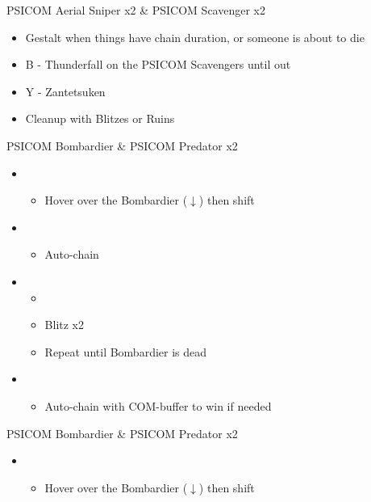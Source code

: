 \begin{paracol}{2}
\begin{battle}{PSICOM Aerial Sniper x2 \& PSICOM Scavenger x2}
\begin{itemize}
\begin{itemize}
				      \item Gestalt when things have chain duration, or someone is about to die
				      \item B - Thunderfall on the PSICOM Scavengers until out
				      \item Y - Zantetsuken
				      \item Cleanup with Blitzes or Ruins
			      \end{itemize}
		\end{itemize}
		 
	\end{battle}
	\switchcolumn*
	\begin{battle}{PSICOM Bombardier \& PSICOM Predator x2}
		\begin{itemize}
			\item \first
			      \begin{itemize}
				      \item Hover over the Bombardier ($\downarrow$) then shift
			      \end{itemize}
			\item \second
			      \begin{itemize}
				      \item Auto-chain
			      \end{itemize}
			\item \first
			      \begin{itemize}
				      \item \stagger
				      \item Blitz x2
				      \item Repeat until Bombardier is dead
			      \end{itemize}
			\item \second
			      \begin{itemize}
				      \item Auto-chain with COM-buffer to win if needed
			      \end{itemize}
		\end{itemize}
		 
	\end{battle}
	\switchcolumn
	\begin{battle}{PSICOM Bombardier \& PSICOM Predator x2}
		\begin{itemize}
			\item \first
			      \begin{itemize}
				      \item Hover over the Bombardier ($\downarrow$) then shift
			      \end{itemize}

\end{itemize}
\end{battle}
\end{paracol}
